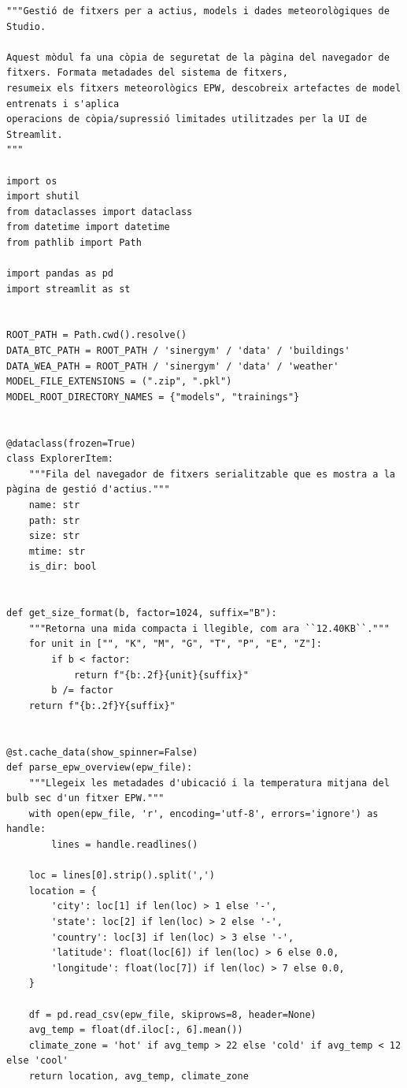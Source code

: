 \documentclass[10pt,a4paper]{article}
\begin{document}
\begin{lstlisting}[style=studioPython,caption={backend/gestionar\_arxius\_backend.py},label={lst:backend-gestionar-arxius-backend-py}]
"""Gestió de fitxers per a actius, models i dades meteorològiques de Studio.

Aquest mòdul fa una còpia de seguretat de la pàgina del navegador de fitxers. Formata metadades del sistema de fitxers,
resumeix els fitxers meteorològics EPW, descobreix artefactes de model entrenats i s'aplica
operacions de còpia/supressió limitades utilitzades per la UI de Streamlit.
"""

import os
import shutil
from dataclasses import dataclass
from datetime import datetime
from pathlib import Path

import pandas as pd
import streamlit as st


ROOT_PATH = Path.cwd().resolve()
DATA_BTC_PATH = ROOT_PATH / 'sinergym' / 'data' / 'buildings'
DATA_WEA_PATH = ROOT_PATH / 'sinergym' / 'data' / 'weather'
MODEL_FILE_EXTENSIONS = (".zip", ".pkl")
MODEL_ROOT_DIRECTORY_NAMES = {"models", "trainings"}


@dataclass(frozen=True)
class ExplorerItem:
    """Fila del navegador de fitxers serialitzable que es mostra a la pàgina de gestió d'actius."""
    name: str
    path: str
    size: str
    mtime: str
    is_dir: bool


def get_size_format(b, factor=1024, suffix="B"):
    """Retorna una mida compacta i llegible, com ara ``12.40KB``."""
    for unit in ["", "K", "M", "G", "T", "P", "E", "Z"]:
        if b < factor:
            return f"{b:.2f}{unit}{suffix}"
        b /= factor
    return f"{b:.2f}Y{suffix}"


@st.cache_data(show_spinner=False)
def parse_epw_overview(epw_file):
    """Llegeix les metadades d'ubicació i la temperatura mitjana del bulb sec d'un fitxer EPW."""
    with open(epw_file, 'r', encoding='utf-8', errors='ignore') as handle:
        lines = handle.readlines()

    loc = lines[0].strip().split(',')
    location = {
        'city': loc[1] if len(loc) > 1 else '-',
        'state': loc[2] if len(loc) > 2 else '-',
        'country': loc[3] if len(loc) > 3 else '-',
        'latitude': float(loc[6]) if len(loc) > 6 else 0.0,
        'longitude': float(loc[7]) if len(loc) > 7 else 0.0,
    }

    df = pd.read_csv(epw_file, skiprows=8, header=None)
    avg_temp = float(df.iloc[:, 6].mean())
    climate_zone = 'hot' if avg_temp > 22 else 'cold' if avg_temp < 12 else 'cool'
    return location, avg_temp, climate_zone



\end{lstlisting}
\end{document}
